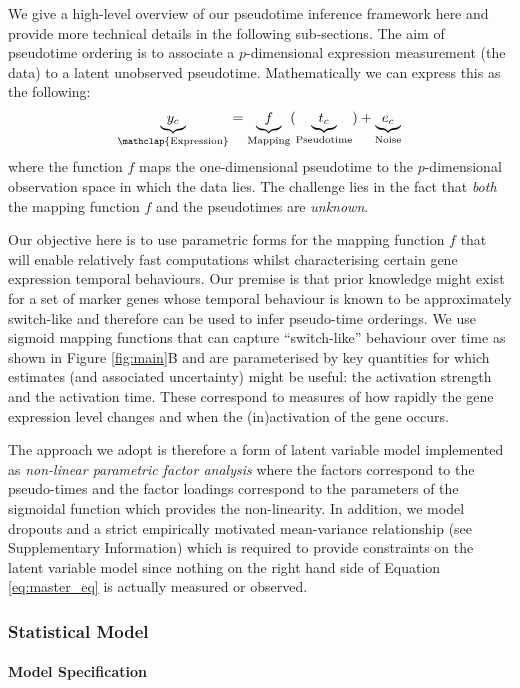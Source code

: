 We give a high-level overview of our pseudotime inference framework here and provide more technical details in the following sub-sections. The aim of pseudotime ordering is to associate a $p$-dimensional expression measurement (the data) to a latent unobserved pseudotime. Mathematically we can express this as the following:
\begin{align}
	\underbrace{y_c}_{\mathclap{\text{Expression}}} = \underbrace{f}_{\text{Mapping}}(\underbrace{t_c}_{\text{Pseudotime}}) + \underbrace{e_c}_{\text{Noise}}
	\label{eq:master_eq}
\end{align}
where the function $f$ maps the one-dimensional pseudotime to the $p$-dimensional observation space in which the data lies. The challenge lies in the fact that \emph{both} the mapping function $f$ and the pseudotimes are \emph{unknown}.

Our objective here is to use parametric forms for the mapping function $f$ that will enable relatively fast computations whilst characterising certain gene expression temporal behaviours. Our premise is that prior knowledge might exist for a set of marker genes whose temporal behaviour is known to be approximately switch-like and therefore can be used to infer pseudo-time orderings. We use sigmoid mapping functions that can capture ``switch-like'' behaviour over time as shown in Figure \ref{fig:main}B and are parameterised by key quantities for which estimates (and associated uncertainty) might be useful: the activation strength and the activation time. These correspond to measures of how rapidly the gene expression level changes and when the (in)activation of the gene occurs.

The approach we adopt is therefore a form of latent variable model implemented as \emph{non-linear parametric factor analysis} where the factors correspond to the pseudo-times and the factor loadings correspond to the parameters of the sigmoidal function which provides the non-linearity. In addition, we model dropouts and a strict empirically motivated mean-variance relationship (see Supplementary Information) which is required to provide constraints on the latent variable model since nothing on the right hand side of Equation \ref{eq:master_eq} is actually measured or observed.

\subsubsection{Statistical Model}

\paragraph{Model Specification}

